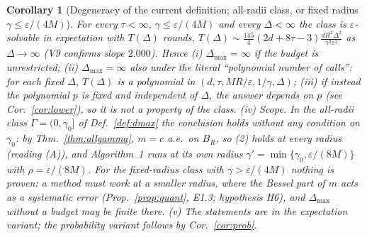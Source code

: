 \documentclass[11pt,a4paper]{article}
\numberwithin{equation}{section}
\newtheorem{corollary}[theorem]{Corollary}
\theoremstyle{definition}
\theoremstyle{remark}
\newcommand{\Dmax}{\Delta_{\max}}\newcommand{\Dcp}{\Delta_{\rm cp}}
\begin{document}
\begin{corollary}[Degeneracy of the current definition; all-radii class, or fixed radius $\gamma\le\varepsilon/(4M)$]\label{cor:degenerate}
For every $\tau<\infty$, $\gamma\le\varepsilon/(4M)$ and every $\Delta<\infty$ the class is $\varepsilon$-solvable in expectation with $T(\Delta)$ rounds, $T(\Delta)\sim\frac{145}4(2d+8\tau-3)\frac{dR^2\Delta^2}{\gamma^2\varepsilon^2}$ as $\Delta\to\infty$ (V9 confirms slope $2.000$). Hence (i) $\Dmax=\infty$ if the budget is unrestricted; (ii) $\Dmax=\infty$ also under the literal ``polynomial number of calls'': for each fixed $\Delta$, $T(\Delta)$ is a polynomial in $(d,\tau,MR/\varepsilon,1/\gamma,\Delta)$; (iii) if instead the polynomial $p$ is fixed and independent of $\Delta$, the answer depends on $p$ (see Cor.~\ref{cor:lower}), so it is not a property of the class.
(iv) \emph{Scope.} In the all-radii class $\Gamma=(0,\gamma_0]$ of Def.~\ref{def:dmax} the conclusion holds without any condition on $\gamma_0$: by Thm.~\ref{thm:allgamma}, $m=c$ a.e.\ on $B_R$, so (2) holds at every radius (reading (A)), and Algorithm~1 runs at its own radius $\gamma'=\min\{\gamma_0,\varepsilon/(8M)\}$ with $\rho=\varepsilon/(8M)$. For the fixed-radius class with $\gamma>\varepsilon/(4M)$ \emph{nothing is proven}: a method must work at a smaller radius, where the Bessel part of $m$ acts as a systematic error (Prop.~\ref{prop:quant}, E1.3; hypothesis H6), and $\Dmax$ without a budget may be finite there.
(v) The statements are in the expectation variant; the probability variant follows by Cor.~\ref{cor:prob}.
\end{corollary}
\end{document}
